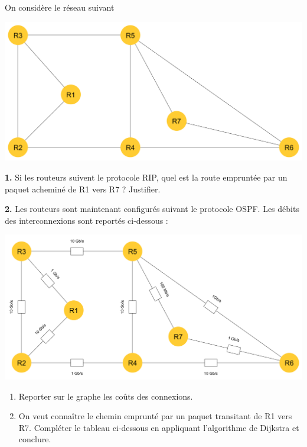 \documentclass[a4paper,12pt,french]{article}
\begin{document}

\begin{exercice}
On 	considère le réseau suivant 
\begin{center}
\includegraphics[width=14cm]{img/rip}
\end{center}

\textbf{1.} Si les routeurs suivent le protocole RIP, quel est la route empruntée par un paquet acheminé de R1 vers R7 ? Justifier.

\textbf{2.} Les routeurs sont maintenant configurés suivant le protocole OSPF. Les débits des interconnexions sont reportés ci-dessous :
\begin{center}
\includegraphics[width=14cm]{img/ospf}
\end{center}
\begin{enumerate}[\bfseries a.]
\item 	Reporter sur le graphe les coûts des connexions.
\item 	On veut connaître le chemin emprunté par un paquet transitant de R1 vers R7. Compléter le tableau ci-dessous en 
appliquant l'algorithme de Dijkstra et conclure.


\end{enumerate}
\end{exercice}
\end{document}
